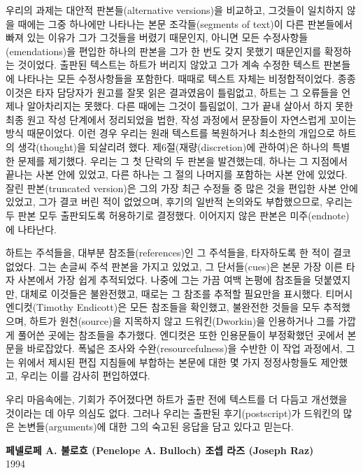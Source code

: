 {우리의 과제는 대안적 판본들(alternative versions)을 비교하고, 그것들이
일치하지 않을 때에는 그중 하나에만 나타나는 본문 조각들(segments of
text)이 다른 판본들에서 빠져 있는 이유가 그가 그것들을 버렸기 때문인지,
아니면 모든 수정사항들(emendations)을 편입한 하나의 판본을 그가 한 번도
갖지 못했기 때문인지를 확정하는 것이었다. 출판된 텍스트는 하트가 버리지
않았고 그가 계속 수정한 텍스트 판본들에 나타나는 모든 수정사항들을
포함한다. 때때로 텍스트 자체는 비정합적이었다. 종종 이것은 타자 담당자가
원고를 잘못 읽은 결과였음이 틀림없고, 하트는 그 오류들을 언제나
알아차리지는 못했다. 다른 때에는 그것이 틀림없이, 그가 끝내 살아서 하지
못한 최종 원고 작성 단계에서 정리되었을 법한, 작성 과정에서 문장들이
자연스럽게 꼬이는 방식 때문이었다. 이런 경우 우리는 원래 텍스트를
복원하거나 최소한의 개입으로 하트의 생각(thought)을 되살리려 했다.
제6절(재량(discretion)에 관하여)은 하나의 특별한 문제를 제기했다. 우리는
그 첫 단락의 두 판본을 발견했는데, 하나는 그 지점에서 끝나는 사본 안에
있었고, 다른 하나는 그 절의 나머지를 포함하는 사본 안에 있었다. 잘린
판본(truncated version)은 그의 가장 최근 수정들 중 많은 것을 편입한 사본
안에 있었고, 그가 결코 버린 적이 없었으며, 후기의 일반적 논의와도
부합했으므로, 우리는 두 판본 모두 출판되도록 허용하기로 결정했다.
이어지지 않은 판본은 미주(endnote)에 나타난다.

하트는 주석들을, 대부분 참조들(references)인 그 주석들을, 타자하도록 한
적이 결코 없었다. 그는 손글씨 주석 판본을 가지고 있었고, 그
단서들(cues)은 본문 가장 이른 타자 사본에서 가장 쉽게 추적되었다. 나중에
그는 가끔 여백 논평에 참조들을 덧붙였지만, 대체로 이것들은 불완전했고,
때로는 그 참조를 추적할 필요만을 표시했다. 티머시 엔디컷(Timothy
Endicott)은 모든 참조들을 확인했고, 불완전한 것들을 모두 추적했으며,
하트가 원천(source)을 지목하지 않고 드워킨(Dworkin)을 인용하거나 그를
가깝게 풀어쓴 곳에는 참조들을 추가했다. 엔디컷은 또한 인용문들이
부정확했던 곳에서 본문을 바로잡았다. 폭넓은 조사와
수완(resourcefulness)을 수반한 이 작업 과정에서, 그는 위에서 제시된 편집
지침들에 부합하는 본문에 대한 몇 가지 정정사항들도 제안했고, 우리는 이를
감사히 편입하였다.

우리 마음속에는, 기회가 주어졌다면 하트가 출판 전에 텍스트를 더 다듬고
개선했을 것이라는 데 아무 의심도 없다. 그러나 우리는 출판된
후기(postscript)가 드워킨의 많은 논변들(arguments)에 대한 그의 숙고된
응답을 담고 있다고 믿는다.

}

\vspace{1em}

\begin{flushright}
\textbf{페넬로페 A. 불로흐 (Penelope A. Bulloch) 조셉 라즈 (Joseph Raz)}
\\ 1994
\end{flushright}
